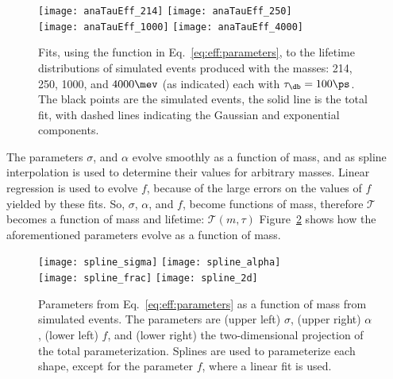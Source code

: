 \begin{figure}
  \begin{center}
    \texttt{[image: anaTauEff\_214]}
    \texttt{[image: anaTauEff\_250]}\\
    \texttt{[image: anaTauEff\_1000]}
    \texttt{[image: anaTauEff\_4000]}
    \caption{\small
      Fits, using the function in Eq.~\protect\ref{eq:eff:parameters},
      to the lifetime distributions of simulated events produced with the masses:
      214, 250, 1000, and $4000\mev$ (as indicated)
      each with $\tau_\db=100\ps$.
      The black points are the simulated events, the solid line is the total fit, with dashed lines
      indicating the Gaussian and exponential components.
    }
    \label{fig:eff:fits}
  \end{center}
\end{figure}

The parameters $\sigma$, and $\alpha$ evolve smoothly as a function of mass, and as
spline interpolation is used to determine their values for arbitrary masses.
Linear regression is used to evolve $f$, because of the large errors on the values of $f$ yielded
by these fits.
So, $\sigma$, $\alpha$, and $f$, become functions of mass, therefore $\mathcal{T}$ becomes a
function of mass and lifetime: $\mathcal{T}(m,\tau)$
Figure~\ref{fig:eff:spline} shows how the aforementioned parameters evolve as a function of mass.

\begin{figure}
  \begin{center}
    \texttt{[image: spline\_sigma]}
    \texttt{[image: spline\_alpha]}\\
    \texttt{[image: spline\_frac]}
    \texttt{[image: spline\_2d]}
    \caption[Parameterization of decay time acceptance as a function of mass]
    {
      Parameters from Eq.~\protect\ref{eq:eff:parameters} as a function of mass from
      simulated events.
      The parameters are
      (upper left) $\sigma$,
      (upper right) $\alpha$,
      (lower left) $f$, and
      (lower right) the two-dimensional projection of the total parameterization.
      Splines are used to parameterize each shape, except for the parameter $f$, where a
      linear fit is used.
    }
    \label{fig:eff:spline}
  \end{center}
\end{figure}


